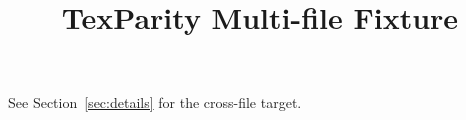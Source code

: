 \documentclass{article}
\title{TexParity Multi-file Fixture}
\begin{document}
\maketitle

See Section~\ref{sec:details} for the cross-file target.

\end{document}
